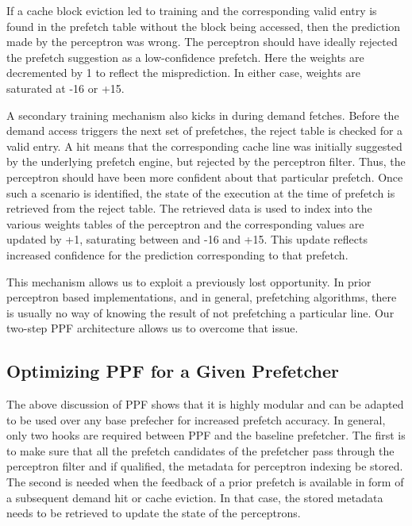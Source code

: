 If a cache block eviction led to training and the corresponding valid
entry is found in the prefetch table without the block being accessed,
then the prediction made by the perceptron was wrong.  The perceptron
should have ideally rejected the prefetch suggestion as a
low-confidence prefetch.  Here the weights are decremented by 1 to
reflect the misprediction. In either case, weights are saturated at
-16 or +15. %

A secondary training mechanism also kicks in during demand fetches.
Before the demand access triggers the next set of prefetches, the
reject table is checked for a valid entry.  A hit means that the
corresponding cache line was initially suggested by the underlying
prefetch engine, but rejected by the perceptron filter.  Thus, the
perceptron should have been more confident about that particular
prefetch.  Once such a scenario is identified, the
state %
of the execution at the time of prefetch is retrieved from the reject
table.  The retrieved data is used to index into the various weights
tables of the perceptron and the corresponding values are updated by
+1, saturating between and -16 and +15.  This update reflects
increased confidence for the prediction corresponding to that
prefetch.

This mechanism allows us to exploit a previously lost opportunity.  In
prior perceptron based implementations, and in general, prefetching
algorithms, there is usually no way of knowing the result of not
prefetching a particular line.  Our two-step PPF architecture allows
us to overcome that issue.

\subsection{Optimizing PPF for a Given Prefetcher}
\label{Arch-Generalizing}
The above discussion of PPF shows that it is highly modular and can be
adapted to be used over any base prefecher for increased prefetch
accuracy.  In general, only two hooks are required between PPF and the
baseline prefetcher. The first is to make sure that all the prefetch
candidates of the prefetcher pass through the perceptron filter and if
qualified, the metadata for perceptron indexing be stored. The second
is needed when the feedback of a prior prefetch is available in form
of a subsequent demand hit or cache eviction. In that case, the stored
metadata needs to be retrieved to update the state of the perceptrons.

